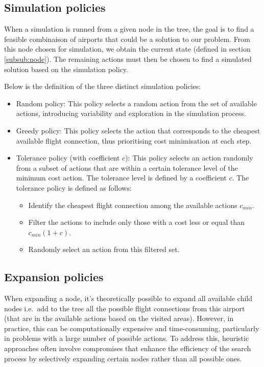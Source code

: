 \subsection{Simulation policies}
\label{sub:simulation_policies}
When a simulation is runned from a given node in the tree, the goal is to find a feasible combinaison of airports that could be a solution to our problem.
From this node chosen for simulation, we obtain the current state (defined in section \ref{subsub:node}). The remaining actions must then be chosen to find a simulated solution based on the simulation policy.

Below is the definition of the three distinct simulation policies:

\begin{itemize}
    \item Random policy: This policy selects a random action from the set of available actions, introducing variability and exploration in the simulation process.
    \item Greedy policy: This policy selects the action that corresponds to the cheapest available flight connection, thus prioritising cost minimisation at each step.

    \item Tolerance policy (with coefficient $c$):
          This policy selects an action randomly from a subset of actions that are within a certain tolerance level of the minimum cost action. The tolerance level is defined by a coefficient $c$. The tolerance policy is defined as follows:
          \begin{itemize}
              \item Identify the cheapest flight connection among the available actions $c_{min}$.
              \item Filter the actions to include only those with a cost less or equal than $c_{min}(1+c) $.
              \item Randomly select an action from this filtered set.
          \end{itemize}

\end{itemize}



\subsection{Expansion policies}
\label{sub:expansion_policies}
When expanding a node, it’s theoretically possible to expand all available child nodes i.e.\ add to the tree all the possible flight connections from this airport (that are in the available actions based on the visited areas). However, in practice, this can be computationally expensive and time-consuming, particularly in problems with a large number of possible actions. To address this, heuristic approaches often involve compromises that enhance the efficiency of the search process by selectively expanding certain nodes rather than all possible ones.


